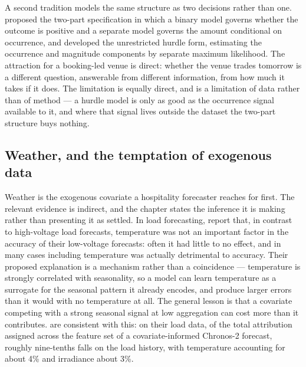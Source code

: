 A second tradition models the same structure as two decisions rather than one.
\citet{cragg_statistical_1971} proposed the two-part specification in which a
binary model governs whether the outcome is positive and a separate model
governs the amount conditional on occurrence, and \citet{mullahy_specification_1986}
developed the unrestricted hurdle form, estimating the occurrence and magnitude
components by separate maximum likelihood. The attraction for a booking-led
venue is direct: whether the venue trades tomorrow is a different question,
answerable from different information, from how much it takes if it does. The
limitation is equally direct, and is a limitation of data rather than of
method --- a hurdle model is only as good as the occurrence signal available to
it, and where that signal lives outside the dataset the two-part structure
buys nothing.

\subsection*{Weather, and the temptation of exogenous data}

Weather is the exogenous covariate a hospitality forecaster reaches for first.
The relevant evidence is indirect, and the chapter states the inference it is
making rather than presenting it as settled. In load forecasting,
\citet{haben_short_2019} report that, in contrast to high-voltage load
forecasts, temperature was not an important factor in the accuracy of their
low-voltage forecasts: often it had little to no effect, and in many cases
including temperature was actually detrimental to accuracy. Their proposed
explanation is a mechanism rather than a coincidence --- temperature is
strongly correlated with seasonality, so a model can learn temperature as a
surrogate for the seasonal pattern it already encodes, and produce larger
errors than it would with no temperature at all. The general lesson is that a
covariate competing with a strong seasonal signal at low aggregation can cost
more than it contributes. \citet{hertel_explainable_2026} are consistent with
this: on their load data, of the total attribution assigned across the feature
set of a covariate-informed Chronos-2 forecast, roughly nine-tenths falls on
the load history, with temperature accounting for about 4\% and irradiance
about 3\%.

